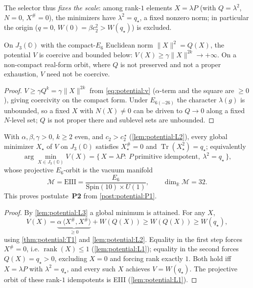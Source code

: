 The selector thus \emph{fixes the scale}: among rank-$1$ elements $X=\lambda P$ (with
$Q=\lambda^2$, $N=0$, $X^\#=0$), the minimizers have $\lambda^2=q_\star$, a fixed nonzero
norm; in particular the origin ($q=0$, $W(0)=\beta c_2^2>W(q_\star)$) is excluded.

\begin{lemma}
\label{lem:potential:L3}
On $J_3(\mathbb O)$ with the compact-$E_6$ Euclidean norm $\|X\|^2=Q(X)$, the potential $V$ is
coercive and bounded below: $V(X)\ge\gamma\|X\|^{2k}\to+\infty$. On a non-compact real-form
orbit, where $Q$ is not preserved and not a proper exhaustion, $V$ need not be coercive.
\end{lemma}

\begin{proof}
$V\ge\gamma Q^k=\gamma\|X\|^{2k}$ from \eqref{eq:potential:v} ($\alpha$-term and the square
are $\ge0$), giving coercivity on the compact form. Under $E_{6(-26)}$ the character
$\lambda(g)$ is unbounded, so a fixed $X$ with $N(X)\neq0$ can be driven to $Q\to0$ along a
fixed $N$-level set; $Q$ is not proper there and sublevel sets are unbounded.
\end{proof}

\begin{theorem}
\label{thm:potential:T4}
\label{thm:vacuum:T4}
\label{thm:potential:vacuum}
\label{thm:ExplicitBreaking}
With $\alpha,\beta,\gamma>0$, $k\ge2$ even, and $c_2>c_2^{\,\star}$
(\autoref{lem:potential:L2}), every global minimizer $X_\star$ of $V$ on $J_3(\mathbb O)$
satisfies $X_\star^\#=0$ and $\operatorname{Tr}(X_\star^2)=q_\star$; equivalently
\begin{equation}
\label{eq:potential:argmin}
\arg\min_{X\in J_3(\mathbb O)}V(X)
=\{\,X=\lambda P:\ P\ \text{primitive idempotent},\ \lambda^2=q_\star\,\},
\end{equation}
whose projective $E_6$-orbit is the vacuum manifold
\begin{equation}
\label{eq:potential:vacuum}
\mathcal M=\mathrm{EIII}=\frac{E_6}{\mathrm{Spin}(10)\times U(1)},
\qquad \dim_{\mathbb R}\mathcal M=32.
\end{equation}
This proves postulate~\textbf{P2} from \autoref{post:potential:P1}.
\end{theorem}

\begin{proof}
By \autoref{lem:potential:L3} a global minimum is attained. For any $X$,
\begin{equation*}
V(X)=\underbrace{\alpha\,\langle X^\#,X^\#\rangle}_{\ge0}+W(Q(X))\ge W(Q(X))\ge W(q_\star),
\end{equation*}
using \autoref{thm:potential:T1} and \autoref{lem:potential:L2}. Equality in the first step
forces $X^\#=0$, i.e. $\operatorname{rank}(X)\le1$ (\autoref{lem:potential:L1}); equality in
the second forces $Q(X)=q_\star>0$, excluding $X=0$ and forcing rank exactly $1$. Both hold
iff $X=\lambda P$ with $\lambda^2=q_\star$, and every such $X$ achieves $V=W(q_\star)$. The
projective orbit of these rank-$1$ idempotents is EIII (\autoref{lem:potential:L1}).
\end{proof}

